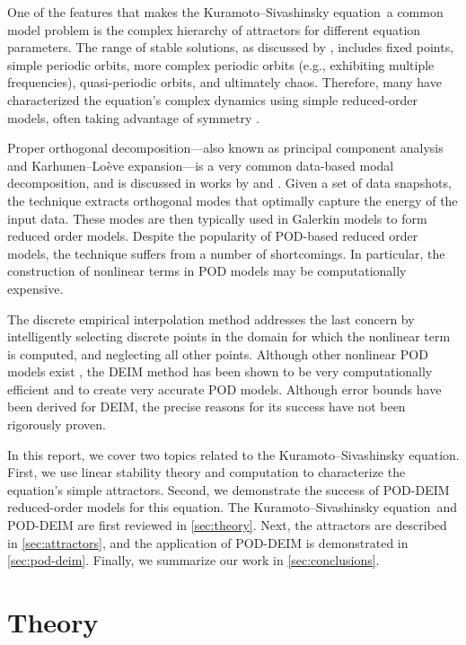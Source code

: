 \documentclass[11pt]{article}
\newcommand{\KSE}{Kuramoto--Sivashinsky equation}
\begin{document}
One of the features that makes the \KSE\ a common model problem is the complex hierarchy of attractors for different equation parameters.
The range of stable solutions, as discussed by \cite{KevrekidisSIAMJAM90}, includes fixed points, simple periodic orbits, more complex periodic orbits (e.g., exhibiting multiple frequencies), quasi-periodic orbits, and ultimately chaos.
Therefore, many have characterized the equation's complex dynamics using simple reduced-order models, often taking advantage of symmetry \citep[e.g.,][]{AubrySIAMJSC93, RowleyPD00}.

Proper orthogonal decomposition---also known as principal component analysis and Karhunen--Lo\`eve expansion---is a very common data-based modal decomposition, and is discussed in works by \cite{SirovichQAM87} and \cite{HolmesTCSDSS}.
Given a set of data snapshots, the technique extracts orthogonal modes that optimally capture the energy of the input data.
These modes are then typically used in Galerkin models to form reduced order models.
Despite the popularity of POD-based reduced order models, the technique suffers from a number of shortcomings.
In particular, the construction of nonlinear terms in POD models may be computationally expensive.

The discrete empirical interpolation method \citep[DEIM;][]{ChaturantabutIEEECDC09, ChaturantabutRice09a} addresses the last concern by intelligently selecting discrete points in the domain for which the nonlinear term is computed, and neglecting all other points.
Although other nonlinear POD models exist \citep[see, e.g.,][]{NoackJFM03}, the DEIM method has been shown to be very computationally efficient and to create very accurate POD models.
Although error bounds have been derived for DEIM, the precise reasons for its success have not been rigorously proven.

In this report, we cover two topics related to the \KSE.
First, we use linear stability theory and computation to characterize the equation's simple attractors.
Second, we demonstrate the success of POD-DEIM reduced-order models for this equation.
The \KSE\ and POD-DEIM are first reviewed in \autoref{sec:theory}.
Next, the attractors are described in \autoref{sec:attractors}, and the application of POD-DEIM is demonstrated in \autoref{sec:pod-deim}.
Finally, we summarize our work in \autoref{sec:conclusions}.

\section{Theory}
\label{sec:theory}
\end{document}
